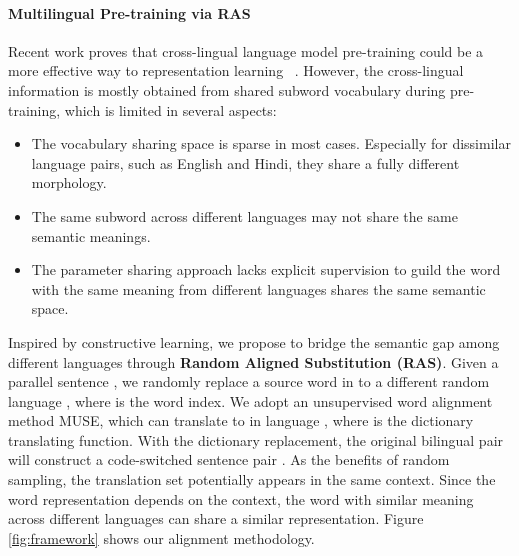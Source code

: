 \documentclass[11pt,a4paper]{article}
\begin{document}
\paragraph{Multilingual Pre-training via RAS}

Recent work proves that cross-lingual language model pre-training could be a more effective way to representation learning ~\cite{DBLP:conf/nips/ConneauL19,huang2019unicoder}.
However, the cross-lingual information is mostly obtained from shared subword vocabulary during pre-training, which is limited in several aspects:
\begin{itemize}
    \setlength{\itemsep}{0pt}
    \setlength{\parsep}{0pt}
    \setlength{\parskip}{0pt}
    \item The vocabulary sharing space is sparse in most cases. Especially for dissimilar language pairs, such as English and Hindi, they share a fully different morphology. 
    \item The same subword across different languages may not share the same semantic meanings. 
    \item The parameter sharing approach lacks explicit supervision to guild the word with the same meaning from different languages shares the same semantic space.
\end{itemize}

Inspired by constructive learning, we propose to bridge the semantic gap among different languages through \textbf{Random Aligned Substitution (RAS)}. 
Given a parallel sentence ,  we randomly replace a source word in  to a different random language , where  is the word index. We adopt an unsupervised word alignment method MUSE\cite{conneau2017word}, which can  translate  to  in language , where  is the dictionary translating function. 
With the dictionary replacement, the original bilingual pair will construct a code-switched sentence pair .  
As the benefits of  random sampling, the translation set   potentially appears in the same context. 
Since the word representation depends on the context, the word with similar meaning across different languages can share a similar representation. Figure \ref{fig:framework} shows our alignment methodology. 
\end{document}
